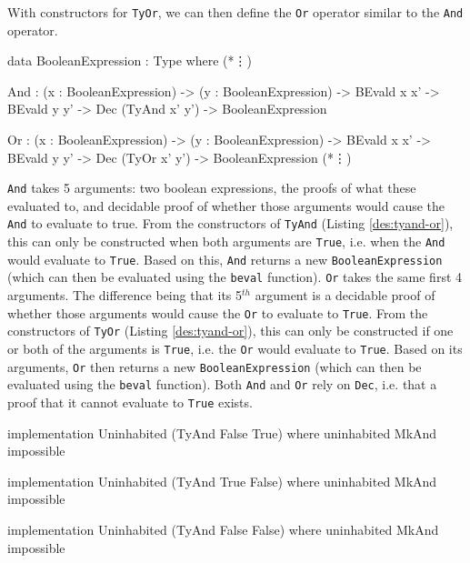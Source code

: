     With constructors for \texttt{TyOr}, we can then define the \texttt{Or} operator similar to the \texttt{And} operator.
    
    \newpage
    
    \begin{code}[caption={The definitions of \texttt{And} and \texttt{Or}}, escapeinside={(*}{*)}]
            data BooleanExpression : Type where
                (*\vdots*)
                
                And :  (x : BooleanExpression)
                    -> (y : BooleanExpression)
                    -> BEvald x x'
                    -> BEvald y y'
                    -> Dec (TyAnd x' y')
                    -> BooleanExpression
                
                Or  :  (x : BooleanExpression)
                    -> (y : BooleanExpression)
                    -> BEvald x x'
                    -> BEvald y y'
                    -> Dec (TyOr x' y')
                    -> BooleanExpression
                (*\vdots*)
    \end{code}

    \texttt{And} takes 5 arguments: two boolean expressions, the proofs of what these evaluated to, and decidable proof of whether those arguments would cause the \texttt{And} to evaluate to true. From the constructors of \texttt{TyAnd} (Listing \ref{des:tyand-or}), this can only be constructed when both arguments are \texttt{True}, i.e. when the \texttt{And} would evaluate to \texttt{True}. Based on this, \texttt{And} returns a new \texttt{BooleanExpression} (which can then be evaluated using the \texttt{beval} function). \texttt{Or} takes the same first 4 arguments. The difference being that its 5$^{th}$ argument is a decidable proof of whether those arguments would cause the \texttt{Or} to evaluate to \texttt{True}. From the constructors of \texttt{TyOr} (Listing \ref{des:tyand-or}), this can only be constructed if one or both of the arguments is \texttt{True}, i.e. the \texttt{Or} would evaluate to \texttt{True}. Based on its arguments, \texttt{Or} then returns a new \texttt{BooleanExpression} (which can then be evaluated using the \texttt{beval} function). Both \texttt{And} and \texttt{Or} rely on \texttt{Dec}, i.e. that a proof that it cannot evaluate to \texttt{True} exists.
    
    \begin{code}[caption={Impossible \texttt{And} cases}]
        implementation Uninhabited (TyAnd False True) where
            uninhabited MkAnd impossible
            
        implementation Uninhabited (TyAnd True False) where
            uninhabited MkAnd impossible
            
        implementation Uninhabited (TyAnd False False) where
            uninhabited MkAnd impossible
    \end{code}

